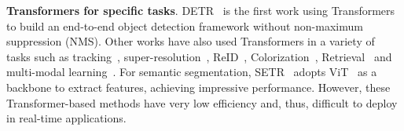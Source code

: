 \textbf{Transformers for specific tasks}. DETR~\cite{DETR} is the first work using Transformers to build an end-to-end object detection framework without non-maximum suppression (NMS). Other works have also used Transformers in a variety of tasks such as tracking~\cite{transtrack,trackformer}, super-resolution~\cite{chen2020pre}, ReID~\cite{transreid}, Colorization~\cite{kumar2021colorization}, Retrieval~\cite{el2021training} and multi-modal learning~\cite{clip,unit}. For semantic segmentation, SETR~\cite{setr} adopts ViT~\cite{vit} as a backbone to extract features, achieving impressive performance. However, these Transformer-based methods have very low efficiency and, thus, difficult to deploy in real-time applications. 
